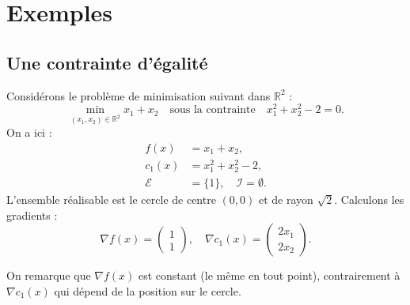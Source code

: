 \section{Exemples}

\subsection{Une contrainte d'égalité}

Considérons le problème de minimisation suivant dans $\mathbb{R}^2$ :
\begin{equation}
    \min_{(x_1, x_2) \in \mathbb{R}^2} x_1 + x_2 \quad \text{sous la contrainte} \quad x_1^2 + x_2^2 - 2 = 0.
\end{equation}
On a ici :
\begin{align*}
    f(x) &= x_1 + x_2, \\
    c_1(x) &= x_1^2 + x_2^2 - 2, \\
    \mathcal{E} &= \{1\}, \quad \mathcal{I} = \emptyset.
\end{align*}
L'ensemble réalisable est le cercle de centre $(0,0)$ et de rayon $\sqrt{2}$.
Calculons les gradients :
\begin{equation}
    \nabla f(x) = \begin{pmatrix} 1 \\ 1 \end{pmatrix}, \quad \nabla c_1(x) = \begin{pmatrix} 2x_1 \\ 2x_2 \end{pmatrix}.
\end{equation}

On remarque que $\nabla f(x)$ est constant (le même en tout point), contrairement à $\nabla c_1(x)$ qui dépend de la position sur le cercle.

